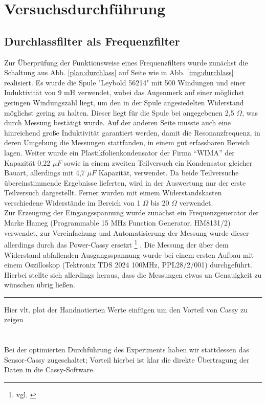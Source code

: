 \section{Versuchsdurchführung}
\subsection{Durchlassfilter als Frequenzfilter}
Zur Überprüfung der Funktionsweise eines Frequenzfilters wurde zunächst die Schaltung aus
Abb. \ref{plan:durchlass} auf Seite \pageref{plan:durchlass} wie in Abb. \ref{img:durchlass} realisiert. Es wurde die Spule "Leybold 56214" mit 500 Windungen und einer Induktivität von 9 mH verwendet, wobei das Augenmerk auf einer möglichst geringen Windungszahl liegt, um den in der Spule angesiedelten Widerstand möglichst gering zu halten. Dieser liegt für die Spule bei angegebenen 2,5 $ \Omega $, was durch Messung bestätigt wurde. Auf
der anderen Seite musste auch eine hinreichend große Induktivität garantiert werden, damit die Resonanzfrequenz, in deren Umgebung die Messungen stattfanden, in einem gut erfassbaren Bereich lagen. Weiter wurde ein Plastikfolienkondensator der Firma \enquote{WIMA} der Kapazität 0,22 $  \mu F $ sowie in einem zweiten Teilversuch ein Kondensator gleicher Bauart, allerdings mit 4,7 $  \mu F $ Kapazität, verwendet. Da beide Teilversuche übereinstimmende Ergebnisse lieferten, wird in der Auswertung nur der erste Teilversuch dargestellt. Ferner wurden
mit eimem Widerstandskasten verschiedene Widerstände im Bereich von 1 $ \Omega $ bis 20 $ \Omega $ verwendet. \\
Zur Erzeugung der Eingangsspannung wurde zunächst ein Frequenzgenerator der Marke Hameg (Programmable 15 MHz Function Generator, HM8131/2) verwendet, zur Vereinfachung und Automatisierung der Messung wurde dieser allerdings durch das Power-Cassy ersetzt \footnote{vgl. \cite[42f.]{cassy2013manual}} .
Die Messung der über dem Widerstand abfallenden Ausgangsspannung wurde bei einem ersten Aufbau mit einem Oszilloskop (Tektronix TDS 2024 100MHz, PPL28/2/001) durchgeführt. Hierbei stellte sich allerdings heraus, dass die Messungen etwas an Genauigkeit zu wünschen übrig ließen.
\hrule Hier vlt. plot der Handnotierten Werte einfügen um den Vorteil von Cassy zu zeigen\\ \\ \\
Bei der optimierten Durchführung des Experiments haben wir stattdessen das Sensor-Cassy zugeschaltet; Vorteil hierbei ist klar die direkte Übertragung der Daten in die Cassy-Software.

